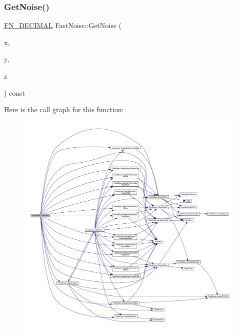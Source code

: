 \subsubsection{\texorpdfstring{Get\+Noise()}{GetNoise()}\hspace{0.1cm}{\footnotesize\ttfamily [2/2]}}
{\footnotesize\ttfamily \mbox{\hyperlink{_fast_noise_8h_a75a9ef6d2541c4921815b885bfd449c3}{F\+N\+\_\+\+D\+E\+C\+I\+M\+AL}} Fast\+Noise\+::\+Get\+Noise (\begin{DoxyParamCaption}\item[{\mbox{\hyperlink{_fast_noise_8h_a75a9ef6d2541c4921815b885bfd449c3}{F\+N\+\_\+\+D\+E\+C\+I\+M\+AL}}}]{x,  }\item[{\mbox{\hyperlink{_fast_noise_8h_a75a9ef6d2541c4921815b885bfd449c3}{F\+N\+\_\+\+D\+E\+C\+I\+M\+AL}}}]{y,  }\item[{\mbox{\hyperlink{_fast_noise_8h_a75a9ef6d2541c4921815b885bfd449c3}{F\+N\+\_\+\+D\+E\+C\+I\+M\+AL}}}]{z }\end{DoxyParamCaption}) const}

Here is the call graph for this function\+:
\nopagebreak
\begin{figure}[H]
\begin{center}
\leavevmode
\includegraphics[width=350pt]{d1/dd8/class_fast_noise_a0d9b7a6858a599cde4dc5b8f74264ae0_cgraph}
\end{center}
\end{figure}
\mbox{\label{class_fast_noise_aea513db44077037f31452d05f06d11e0}} 
